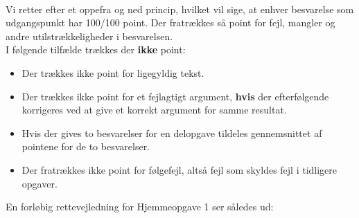 \documentclass{article}
\begin{document}
\vspace*{0.2cm}\\
Vi retter efter et oppefra og ned princip, hvilket vil sige, at enhver besvarelse som udgangspunkt har 100/100 point. Der fratrækkes så point for fejl, mangler og andre utilstrækkeligheder i besvarelsen.
\vspace*{0.2cm}\\
I følgende tilfælde trækkes der \textbf{ikke} point:
\begin{itemize}
	\item Der trækkes ikke point for ligegyldig tekst.
	\item Der trækkes ikke point for et fejlagtigt argument, \textbf{hvis} der efterfølgende korrigeres ved at give et korrekt argument for samme resultat. 
	\item Hvis der gives to besvarelser for en delopgave tildeles gennemsnittet af pointene for de to besvarelser.
	\item Der fratrækkes ikke point for følgefejl, altså fejl som skyldes fejl i tidligere opgaver.
\end{itemize}

En forløbig rettevejledning for Hjemmeopgave 1 ser således ud:
\end{document}

